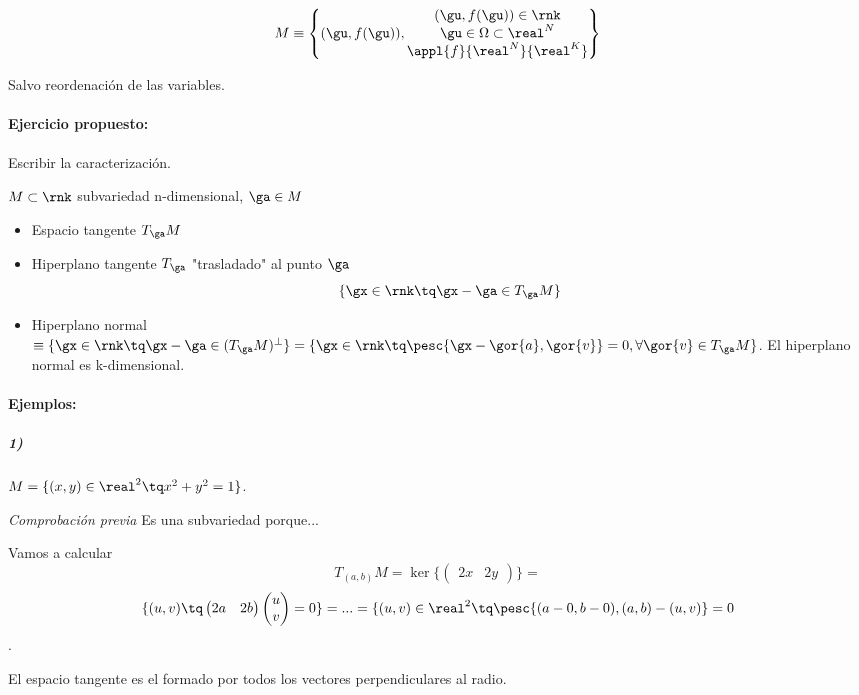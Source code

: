 \[M\equiv \left\{(\gu,f(\gu)),\begin{matrix}
(\gu,f(\gu))\in \rnk\\
\gu \in \Omega\subset\real^N\\
 \appl{f}{\real^N}{\real^K}\end{matrix}\right\} \]

Salvo reordenación de las variables.

\paragraph{Ejercicio propuesto:} Escribir la caracterización.

\begin{defn}
$M\subset\rnk$ subvariedad n-dimensional, $\ga \in M$

\begin{itemize}
\item Espacio tangente $T_{\ga}M$
\item Hiperplano tangente $T_{\ga}$ "trasladado" al punto $\ga$
\[\{\gx \in \rnk \tq \gx-\ga \in T_{\ga}M\}\]
\item Hiperplano normal $\equiv \{\gx\in\rnk \tq \gx -\ga \in (T_{\ga}M)^{\bot}\} = \{\gx \in \rnk \tq \pesc{\gx-\gor{a},\gor{v}} = 0, \forall \gor{v}\in T_{\ga}M\}$. El hiperplano normal es k-dimensional.
\end{itemize}
\end{defn}


\paragraph{Ejemplos:}

\subparagraph{1)}

$ M = \{(x,y) \in \real^2 \tq x^2+y^2 = 1\}$.

\textit{Comprobación previa} Es una subvariedad porque...


Vamos a calcular \[T_{(a,b)}M = \ker \{\begin{pmatrix} 2x & 2y \end{pmatrix}\} =\]
\[ \{(u,v) \tq \begin{pmatrix}
2a & 2b
\end{pmatrix}\begin{pmatrix}
u\\v
\end{pmatrix} = 0\} = ... =  \{(u,v)\in \real^2 \tq \pesc{(a-0,b-0),(a,b)-(u,v)} = 0\].

El espacio tangente es el formado por todos los vectores perpendiculares al radio.

